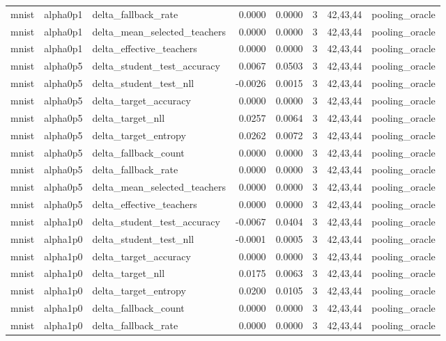 \begin{tabular}{lllrrrll}
mnist & alpha0p1 & delta\_fallback\_rate & 0.0000 & 0.0000 & 3 & 42,43,44 & pooling\_oracle \\
mnist & alpha0p1 & delta\_mean\_selected\_teachers & 0.0000 & 0.0000 & 3 & 42,43,44 & pooling\_oracle \\
mnist & alpha0p1 & delta\_effective\_teachers & 0.0000 & 0.0000 & 3 & 42,43,44 & pooling\_oracle \\
mnist & alpha0p5 & delta\_student\_test\_accuracy & 0.0067 & 0.0503 & 3 & 42,43,44 & pooling\_oracle \\
mnist & alpha0p5 & delta\_student\_test\_nll & -0.0026 & 0.0015 & 3 & 42,43,44 & pooling\_oracle \\
mnist & alpha0p5 & delta\_target\_accuracy & 0.0000 & 0.0000 & 3 & 42,43,44 & pooling\_oracle \\
mnist & alpha0p5 & delta\_target\_nll & 0.0257 & 0.0064 & 3 & 42,43,44 & pooling\_oracle \\
mnist & alpha0p5 & delta\_target\_entropy & 0.0262 & 0.0072 & 3 & 42,43,44 & pooling\_oracle \\
mnist & alpha0p5 & delta\_fallback\_count & 0.0000 & 0.0000 & 3 & 42,43,44 & pooling\_oracle \\
mnist & alpha0p5 & delta\_fallback\_rate & 0.0000 & 0.0000 & 3 & 42,43,44 & pooling\_oracle \\
mnist & alpha0p5 & delta\_mean\_selected\_teachers & 0.0000 & 0.0000 & 3 & 42,43,44 & pooling\_oracle \\
mnist & alpha0p5 & delta\_effective\_teachers & 0.0000 & 0.0000 & 3 & 42,43,44 & pooling\_oracle \\
mnist & alpha1p0 & delta\_student\_test\_accuracy & -0.0067 & 0.0404 & 3 & 42,43,44 & pooling\_oracle \\
mnist & alpha1p0 & delta\_student\_test\_nll & -0.0001 & 0.0005 & 3 & 42,43,44 & pooling\_oracle \\
mnist & alpha1p0 & delta\_target\_accuracy & 0.0000 & 0.0000 & 3 & 42,43,44 & pooling\_oracle \\
mnist & alpha1p0 & delta\_target\_nll & 0.0175 & 0.0063 & 3 & 42,43,44 & pooling\_oracle \\
mnist & alpha1p0 & delta\_target\_entropy & 0.0200 & 0.0105 & 3 & 42,43,44 & pooling\_oracle \\
mnist & alpha1p0 & delta\_fallback\_count & 0.0000 & 0.0000 & 3 & 42,43,44 & pooling\_oracle \\
mnist & alpha1p0 & delta\_fallback\_rate & 0.0000 & 0.0000 & 3 & 42,43,44 & pooling\_oracle \\

\end{tabular}
